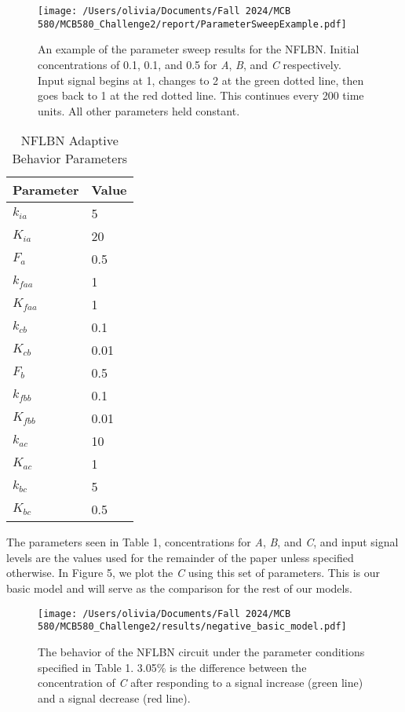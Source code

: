 \documentclass{article}
\begin{document}
\begin{figure}[H]
    \centering
    \texttt{[image: /Users/olivia/Documents/Fall 2024/MCB 580/MCB580\_Challenge2/report/ParameterSweepExample.pdf]}
    \caption{An example of the parameter sweep results for the NFLBN. Initial concentrations of 0.1, 0.1, and 0.5 for \textit{A}, \textit{B}, and \textit{C} respectively. Input signal begins at 1, changes to 2 at the green dotted line, then goes back to 1 at the red dotted line. This continues every 200 time units. All other parameters held constant.}
    \label{fig:4}
\end{figure}

\begin{table}[h]
    \centering
    \caption{NFLBN Adaptive Behavior Parameters}
    \begin{tabular}{@{}ll@{}}
        \toprule
        Parameter & Value \\ 
        \midrule
        \(k_{ia}\) & 5 \\
        \(K_{ia}\) & 20 \\
        \(F_a\) & 0.5 \\
        \(k_{faa}\) & 1 \\
        \(K_{faa}\) & 1 \\
        \(k_{cb}\) & 0.1 \\
        \(K_{cb}\) & 0.01 \\
        \(F_b\) & 0.5 \\
        \(k_{fbb}\) & 0.1 \\
        \(K_{fbb}\) & 0.01 \\
        \(k_{ac}\) & 10 \\
        \(K_{ac}\) & 1 \\
        \(k_{bc}\) & 5 \\
        \(K_{bc}\) & 0.5 \\
        \bottomrule
    \end{tabular}
    \label{tab:parameters}
\end{table}

The parameters seen in Table 1, concentrations for \textit{A}, \textit{B}, and \textit{C}, and input signal levels are the values used for the remainder of the paper unless specified otherwise. In Figure 5, we plot the \textit{C} using this set of parameters. This is our basic model and will serve as the comparison for the rest of our models. 

\begin{figure}[H]
    \centering
    \texttt{[image: /Users/olivia/Documents/Fall 2024/MCB 580/MCB580\_Challenge2/results/negative\_basic\_model.pdf]}
    \caption{The behavior of the NFLBN circuit under the parameter conditions specified in Table 1. 3.05\% is the difference between the concentration of \textit{C} after responding to a signal increase (green line) and a signal decrease (red line).}
    \label{fig:5}
\end{figure}
\end{document}
